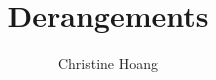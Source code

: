 \documentclass{article}
\title{Derangements}
\author{Christine Hoang}
\begin{document}
\maketitle

\section{}
\end{document}
